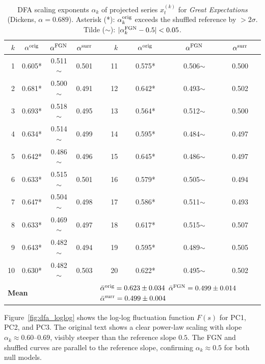\documentclass[12pt,a4paper]{article}
\begin{document}
\begin{table}[htbp]
\centering
\caption{DFA scaling exponents $\alpha_k$ of projected series
$x_t^{(k)}$ for \emph{Great Expectations} (Dickens, $\alpha=0.689$).
Asterisk (*): $\alpha_k^{\rm orig}$ exceeds the shuffled
reference by $>2\sigma$.
Tilde ($\sim$): $|\alpha_k^{\rm FGN} - 0.5| < 0.05$.}
\label{tab:dfa_proj}
\scriptsize
\setlength{\tabcolsep}{4pt}
\begin{tabular}{r ccc r ccc}
\toprule
$k$ & $\alpha^{\rm orig}$ & $\alpha^{\rm FGN}$ &
    $\alpha^{\rm surr}$ &
$k$ & $\alpha^{\rm orig}$ & $\alpha^{\rm FGN}$ &
    $\alpha^{\rm surr}$ \\
\midrule
 1 & 0.605* & 0.511$\sim$ & 0.501 &
11 & 0.575* & 0.506$\sim$ & 0.500 \\
 2 & 0.681* & 0.500$\sim$ & 0.491 &
12 & 0.642* & 0.493$\sim$ & 0.502 \\
 3 & 0.693* & 0.518$\sim$ & 0.495 &
13 & 0.564* & 0.512$\sim$ & 0.500 \\
 4 & 0.634* & 0.514$\sim$ & 0.499 &
14 & 0.595* & 0.484$\sim$ & 0.497 \\
 5 & 0.642* & 0.486$\sim$ & 0.496 &
15 & 0.645* & 0.486$\sim$ & 0.497 \\
 6 & 0.633* & 0.515$\sim$ & 0.501 &
16 & 0.579* & 0.505$\sim$ & 0.494 \\
 7 & 0.647* & 0.504$\sim$ & 0.498 &
17 & 0.586* & 0.511$\sim$ & 0.493 \\
 8 & 0.633* & 0.469$\sim$ & 0.497 &
18 & 0.617* & 0.515$\sim$ & 0.507 \\
 9 & 0.643* & 0.482$\sim$ & 0.494 &
19 & 0.595* & 0.489$\sim$ & 0.505 \\
10 & 0.630* & 0.482$\sim$ & 0.503 &
20 & 0.622* & 0.495$\sim$ & 0.502 \\
\midrule
\multicolumn{4}{l}{\textbf{Mean}} &
\multicolumn{4}{l}{$\bar\alpha^{\rm orig}=0.623\pm0.034$ \quad
                   $\bar\alpha^{\rm FGN}=0.499\pm0.014$ \quad
                   $\bar\alpha^{\rm surr}=0.499\pm0.004$}\\
\bottomrule
\end{tabular}
\end{table}

Figure~\ref{fig:dfa_loglog} shows the log-log fluctuation
function $F(s)$ for PC1, PC2, and PC3.
The original text shows a clear power-law scaling with
slope $\alpha_k \approx 0.60$--$0.69$, visibly steeper than
the reference slope $0.5$.
The FGN and shuffled curves are parallel to the reference slope,
confirming $\alpha_k \approx 0.5$ for both null models.
\end{document}
